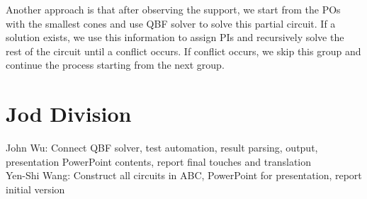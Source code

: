 Another approach is that after observing the support, we start from the POs with the smallest cones and use QBF solver to solve this partial circuit. If a solution exists, we use this information to assign PIs and recursively solve the rest of the circuit until a conflict occurs. If conflict occurs, we skip this group and continue the process starting from the next group.

\section{Jod Division}
John Wu: Connect QBF solver, test automation, result parsing, output, presentation PowerPoint contents, report final touches and translation\\

Yen-Shi Wang: Construct all circuits in ABC, PowerPoint for presentation, report initial version \\

